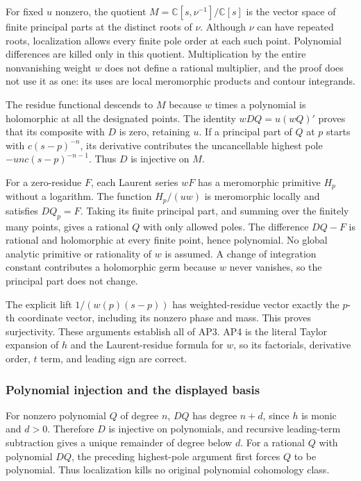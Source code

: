 For fixed \(u\) nonzero, the quotient \(M=\mathbb C[s,\nu^{-1}]/\mathbb C[s]\) is the vector space of finite principal parts at the distinct roots of \(\nu\). Although \(\nu\) can have repeated roots, localization allows every finite pole order at each such point. Polynomial differences are killed only in this quotient. Multiplication by the entire nonvanishing weight \(w\) does not define a rational multiplier, and the proof does not use it as one: its uses are local meromorphic products and contour integrands.

The residue functional descends to \(M\) because \(w\) times a polynomial is holomorphic at all the designated points. The identity \(w DQ=u(wQ)'\) proves that its composite with \(D\) is zero, retaining \(u\). If a principal part of \(Q\) at \(p\) starts with \(c(s-p)^{-n}\), its derivative contributes the uncancellable highest pole \(-u n c(s-p)^{-n-1}\). Thus \(D\) is injective on \(M\).

For a zero-residue \(F\), each Laurent series \(wF\) has a meromorphic primitive \(H_p\) without a logarithm. The function \(H_p/(u w)\) is meromorphic locally and satisfies \(DQ_p=F\). Taking its finite principal part, and summing over the finitely many points, gives a rational \(Q\) with only allowed poles. The difference \(DQ-F\) is rational and holomorphic at every finite point, hence polynomial. No global analytic primitive or rationality of \(w\) is assumed. A change of integration constant contributes a holomorphic germ because \(w\) never vanishes, so the principal part does not change.

The explicit lift \(1/(w(p)(s-p))\) has weighted-residue vector exactly the \(p\)-th coordinate vector, including its nonzero phase and mass. This proves surjectivity. These arguments establish all of AP3. AP4 is the literal Taylor expansion of \(h\) and the Laurent-residue formula for \(w\), so its factorials, derivative order, \(t\) term, and leading sign are correct.

\subsubsection{Polynomial injection and the displayed basis}\label{endpoint-analytic_pole_review--polynomial-injection-and-the-displayed-basis}

For nonzero polynomial \(Q\) of degree \(n\), \(DQ\) has degree \(n+d\), since \(h\) is monic and \(d>0\). Therefore \(D\) is injective on polynomials, and recursive leading-term subtraction gives a unique remainder of degree below \(d\). For a rational \(Q\) with polynomial \(DQ\), the preceding highest-pole argument first forces \(Q\) to be polynomial. Thus localization kills no original polynomial cohomology class.

